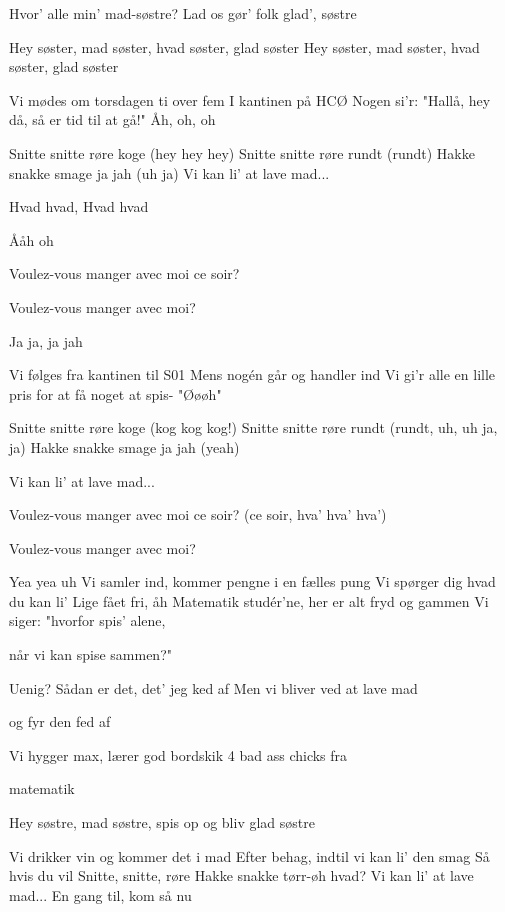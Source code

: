 \documentclass[a4paper,11pt]{article}
\begin{document}
\begin{song}
 Hvor' alle min' mad-søstre?
Lad os gør' folk glad', søstre

 Hey søster, mad søster, hvad søster, glad søster
Hey søster, mad søster, hvad søster, glad søster

 Vi mødes om torsdagen ti over fem
I kantinen på HCØ
Nogen si'r: "Hallå, hey då, så er tid til at gå!" Åh, oh, oh

 Snitte snitte røre koge (hey hey hey)
Snitte snitte røre rundt (rundt)
Hakke snakke smage ja jah (uh ja)
 Vi kan li' at lave mad...

 Hvad hvad, Hvad hvad

 Ååh oh

 Voulez-vous manger avec moi ce soir?

 Voulez-vous manger avec moi?

 Ja ja, ja jah

 Vi følges fra kantinen til S01
Mens nogén går og handler ind
Vi gi'r alle en lille pris for at få noget at spis-
"Øøøh"

 Snitte snitte røre koge (kog kog kog!)
Snitte snitte røre rundt (rundt, uh, uh ja, ja)
Hakke snakke smage ja jah (yeah)

 Vi kan li' at lave mad...

 Voulez-vous manger avec moi ce soir? (ce soir, hva' hva' hva')

 Voulez-vous manger avec moi?

 Yea yea uh
Vi samler ind, kommer pengne i en fælles pung
Vi spørger dig hvad du kan li'
Lige fået fri, åh
Matematik studér'ne, her er alt fryd og gammen
Vi siger: "hvorfor spis' alene,

 når vi kan spise sammen?"

 Uenig? Sådan er det, det' jeg ked af
Men vi bliver ved at lave mad

 og fyr den fed af

 Vi hygger max, lærer god bordskik
4 bad ass chicks fra

 matematik

 Hey søstre, mad søstre, spis op og bliv glad søstre

 Vi drikker vin og kommer det i mad
Efter behag, indtil vi kan li' den smag
Så hvis du vil Snitte, snitte, røre
Hakke snakke tørr-øh hvad?
Vi kan li' at lave mad...
En gang til, kom så nu


\end{song}
\end{document}
